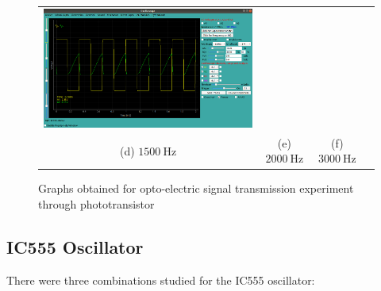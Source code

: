 \documentclass[%
 aip,
 amsmath,amssymb,
 reprint, floatfix%
]{revtex4-1}
\begin{document}
\begin{figure}[htp]
\begin{tabular}{cccc}
    \includegraphics[width=.325\textwidth]{Figures/photo_3000.png}\\
    (d) $\SI{1500}{\hertz}$ & (e) $\SI{2000}{\hertz}$ & (f) $\SI{3000}{\hertz}$  \\[6pt]
    \end{tabular}
    \caption{Graphs obtained for opto-electric signal transmission experiment through phototransistor}
    \label{fig:opto}
    \end{figure}
    \subsection{IC555 Oscillator}
    There were three combinations studied for the IC555 oscillator:
\end{document}
